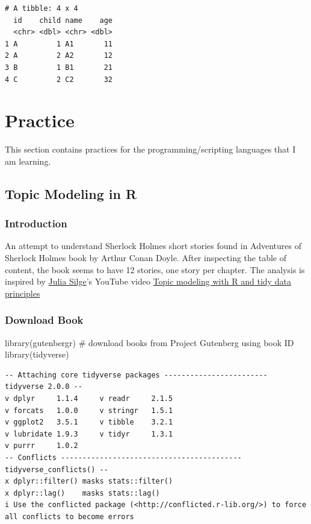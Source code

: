 \documentclass[
  letterpaper,
  DIV=11,
  numbers=noendperiod]{scrreprt}
\newenvironment{Shaded}{\begin{snugshade}}{\end{snugshade}}
\newcommand{\CommentTok}[1]{\textcolor[rgb]{0.37,0.37,0.37}{#1}}
\newcommand{\FunctionTok}[1]{\textcolor[rgb]{0.28,0.35,0.67}{#1}}
\newcommand{\NormalTok}[1]{\textcolor[rgb]{0.00,0.23,0.31}{#1}}
\begin{document}
\begin{verbatim}
# A tibble: 4 x 4
  id    child name    age
  <chr> <dbl> <chr> <dbl>
1 A         1 A1       11
2 A         2 A2       12
3 B         1 B1       21
4 C         2 C2       32
\end{verbatim}

\part{Practice}

This section contains practices for the programming/scripting languages
that I am learning.

\chapter{Topic Modeling in R}\label{topic-modeling-in-r}

\section{Introduction}\label{introduction-5}

An attempt to understand Sherlock Holmes short stories found in
Adventures of Sherlock Holmes book by Arthur Conan Doyle. After
inspecting the table of content, the book seems to have 12 stories, one
story per chapter. The analysis is inspired by
\href{https://juliasilge.com/}{Julia Silge}'s YouTube video
\href{https://www.youtube.com/embed/evTuL-RcRpc}{Topic modeling with R
and tidy data principles}

\section{Download Book}\label{download-book}

\begin{Shaded}
\begin{Highlighting}[]
\FunctionTok{library}\NormalTok{(gutenbergr)  }\CommentTok{\# download books from Project Gutenberg using book ID}
\FunctionTok{library}\NormalTok{(tidyverse)}
\end{Highlighting}
\end{Shaded}

\begin{verbatim}
-- Attaching core tidyverse packages ------------------------ tidyverse 2.0.0 --
v dplyr     1.1.4     v readr     2.1.5
v forcats   1.0.0     v stringr   1.5.1
v ggplot2   3.5.1     v tibble    3.2.1
v lubridate 1.9.3     v tidyr     1.3.1
v purrr     1.0.2     
-- Conflicts ------------------------------------------ tidyverse_conflicts() --
x dplyr::filter() masks stats::filter()
x dplyr::lag()    masks stats::lag()
i Use the conflicted package (<http://conflicted.r-lib.org/>) to force all conflicts to become errors
\end{verbatim}
\end{document}

